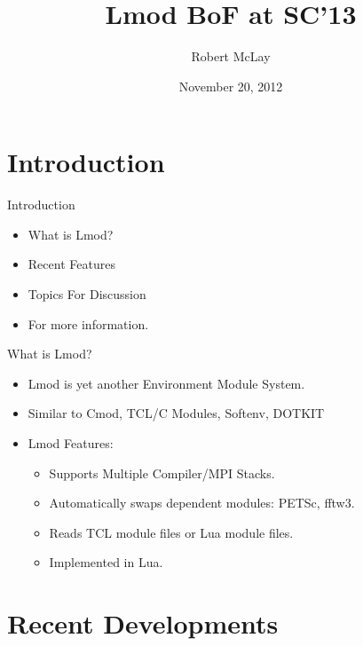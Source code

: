 \documentclass{beamer}
\title{Lmod BoF at SC'13}
\author{Robert McLay}
\institute{The Texas Advanced Computing Center}
\date{November 20, 2012}  %
\begin{document}
\begin{frame}
  \titlepage
\end{frame}

\section{Introduction}

\begin{frame}{Introduction}
  \begin{itemize}
    \item What is Lmod?
    \item Recent Features
    \item Topics For Discussion
    \item For more information.
  \end{itemize}
\end{frame}


\begin{frame}{What is Lmod?}
  \begin{itemize}
    \item Lmod is yet another Environment Module System.
    \item Similar to Cmod, TCL/C Modules, Softenv, DOTKIT
    \item Lmod Features:
      \begin{itemize}
        \item Supports Multiple Compiler/MPI Stacks.
        \item Automatically swaps dependent modules: PETSc, fftw3.
        \item Reads TCL module files or Lua module files.
        \item Implemented in Lua.
      \end{itemize}
  \end{itemize}
\end{frame}

\section{Recent Developments}
\end{document}
